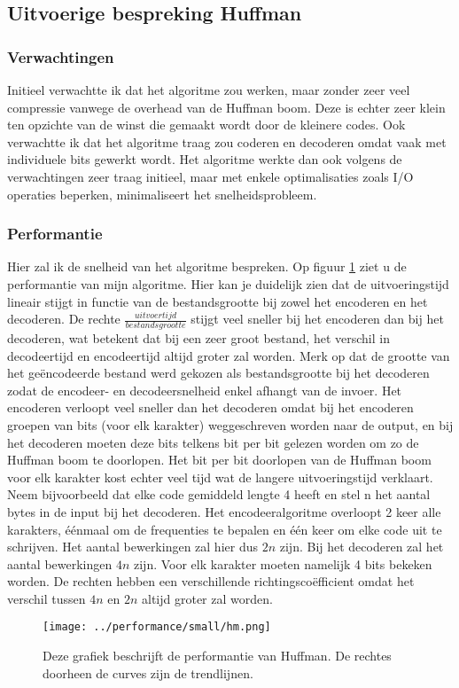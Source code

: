 \documentclass[11pt, a4paper]{article}
\begin{document}
\subsection{Uitvoerige bespreking Huffman}
\subsubsection{Verwachtingen}
Initieel verwachtte ik dat het algoritme zou werken, maar zonder zeer veel compressie vanwege de overhead van de Huffman boom. Deze is echter zeer klein ten opzichte van de winst die gemaakt wordt door de kleinere codes. Ook verwachtte ik dat het algoritme traag zou coderen en decoderen omdat vaak met individuele bits gewerkt wordt. Het algoritme werkte dan ook volgens de verwachtingen zeer traag initieel, maar met enkele optimalisaties zoals I/O operaties beperken, minimaliseert het snelheidsprobleem. 

\subsubsection{Performantie}
Hier zal ik de snelheid van het algoritme bespreken. Op figuur \ref{fig:performance_huffman} ziet u de performantie van mijn algoritme. Hier kan je duidelijk zien dat de uitvoeringstijd lineair stijgt in functie van de bestandsgrootte bij zowel het encoderen en het decoderen. De rechte $\frac{uitvoertijd}{bestandsgrootte}$ stijgt veel sneller bij het encoderen dan bij het decoderen, wat betekent dat bij een zeer groot bestand, het verschil in decodeertijd en encodeertijd altijd groter zal worden. Merk op dat de grootte van het ge\"{e}ncodeerde bestand werd gekozen als bestandsgrootte bij het decoderen zodat de encodeer- en decodeersnelheid enkel afhangt van de invoer. Het encoderen verloopt veel sneller dan het decoderen omdat bij het encoderen groepen van bits (voor elk karakter) weggeschreven worden naar de output, en bij het decoderen moeten deze bits telkens bit per bit gelezen worden om zo de Huffman boom te doorlopen. Het bit per bit doorlopen van de Huffman boom voor elk karakter kost echter veel tijd wat de langere uitvoeringstijd verklaart. Neem bijvoorbeeld dat elke code gemiddeld lengte 4 heeft en stel n het aantal bytes in de input bij het decoderen. Het encodeeralgoritme overloopt 2 keer alle karakters, \'{e}\'{e}nmaal om de frequenties te bepalen en \'{e}\'{e}n keer om elke code uit te schrijven. Het aantal bewerkingen zal hier dus $2n$ zijn. Bij het decoderen zal het aantal bewerkingen $4n$ zijn. Voor elk karakter moeten namelijk 4 bits bekeken worden. De rechten hebben een verschillende richtingsco\"{e}fficient omdat het verschil tussen $4n$ en $2n$ altijd groter zal worden. 
\begin{figure}
	\begin{center}
		\texttt{[image: ../performance/small/hm.png]}
	\end{center}
	\caption{Deze grafiek beschrijft de performantie van Huffman. De rechtes doorheen de curves zijn de trendlijnen.}
	\label{fig:performance_huffman}
\end{figure}
\end{document}
